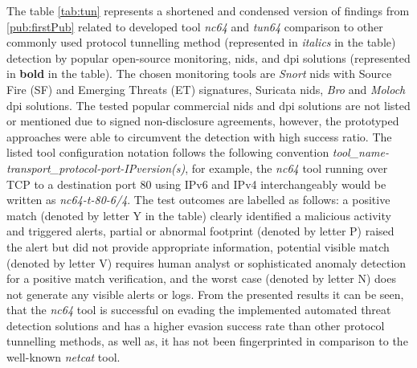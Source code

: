 The table \ref{tab:tun} represents a shortened and condensed version of findings from \ref{pub:firstPub} related to developed tool \textit{nc64} and \textit{tun64} comparison to other commonly used protocol tunnelling method (represented in \textit{italics} in the table) detection by popular open-source monitoring, \gls{nids}, and \gls{dpi} solutions (represented in \textbf{bold} in the table). The chosen monitoring tools are \textit{Snort} \gls{nids} with Source Fire (SF) and Emerging Threats (ET) signatures, Suricata \gls{nids}, \textit{Bro} and \textit{Moloch} \gls{dpi} solutions. The tested popular commercial \gls{nids} and \gls{dpi} solutions are not listed or mentioned due to signed non-disclosure agreements, however, the prototyped approaches were able to circumvent the detection with high success ratio.
The listed tool configuration notation follows the following convention \textit{tool\_name-transport\_protocol-port-IPversion(s)}, for example, the \textit{nc64} tool running over TCP to a destination port 80 using IPv6 and IPv4 interchangeably would be written as \textit{nc64-t-80-6/4}.
The test outcomes are labelled as follows: a positive match (denoted by letter Y in the table) clearly identified a malicious activity and triggered alerts, partial or abnormal footprint (denoted by letter P) raised the alert but did not provide appropriate information, potential visible match (denoted by letter V) requires human analyst or sophisticated anomaly detection for a positive match verification, and the worst case (denoted by letter N) does not generate any visible alerts or logs. From the presented results it can be seen, that the \textit{nc64} tool is successful on evading the implemented automated threat detection solutions and has a higher evasion success rate than other protocol tunnelling methods, as well as, it has not been fingerprinted in comparison to the well-known \textit{netcat} tool.

